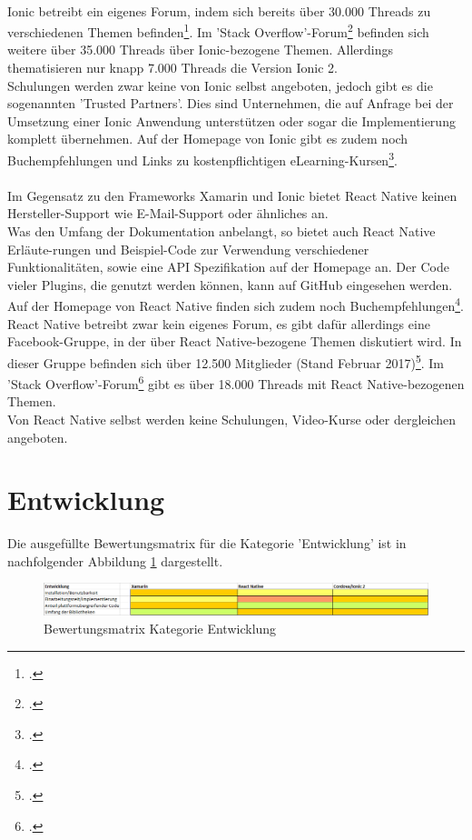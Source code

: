 \\
Ionic betreibt ein eigenes Forum, indem sich bereits über 30.000 Threads zu verschiedenen Themen befinden\footcite{IonicForums}. Im 'Stack Overflow'-Forum\footcite{StackOverfolw} befinden sich weitere über 35.000 Threads über Ionic-bezogene Themen. Allerdings thematisieren nur knapp 7.000 Threads die Version Ionic 2. 
\\
Schulungen werden zwar keine von Ionic selbst angeboten, jedoch gibt es die sogenannten 'Trusted Partners'. Dies sind Unternehmen, die auf Anfrage bei der Umsetzung einer Ionic Anwendung unterstützen oder sogar die Implementierung komplett übernehmen. Auf der Homepage von Ionic gibt es zudem noch Buchempfehlungen und Links zu kostenpflichtigen eLearning-Kursen\footcite{IonicHomepage}.
\\
\\
Im Gegensatz zu den Frameworks Xamarin und Ionic bietet React Native keinen Hersteller-Support wie E-Mail-Support oder ähnliches an.
\\
Was den Umfang der Dokumentation anbelangt, so bietet auch React Native Erläute-rungen und Beispiel-Code zur Verwendung verschiedener Funktionalitäten, sowie eine API Spezifikation auf der Homepage an. Der Code vieler Plugins, die genutzt werden können, kann auf GitHub eingesehen werden. Auf der Homepage von React Native finden sich zudem noch Buchempfehlungen\footcite{ReactNativeHomepage}.
\\
React Native betreibt zwar kein eigenes Forum, es gibt dafür allerdings eine Facebook-Gruppe, in der über React Native-bezogene Themen diskutiert wird. In dieser Gruppe befinden sich über 12.500 Mitglieder (Stand Februar 2017)\footcite{ReactNativeFB}. Im 'Stack Overflow'-Forum\footcite{StackOverfolw} gibt es über 18.000 Threads mit React Native-bezogenen Themen. 
\\
Von React Native selbst werden keine Schulungen, Video-Kurse oder dergleichen angeboten. 

\section{Entwicklung} \label{AuswEntwicklung}

Die ausgefüllte Bewertungsmatrix für die Kategorie 'Entwicklung' ist in nachfolgender Abbildung \ref{fig:AuswEntw} dargestellt.

\begin{figure}[h]
	\centering
	\includegraphics[width=1\textwidth]{Bilder/Auswertung_Entwicklung.PNG}
	\caption{Bewertungsmatrix Kategorie Entwicklung}
	\label{fig:AuswEntw}
\end{figure}

